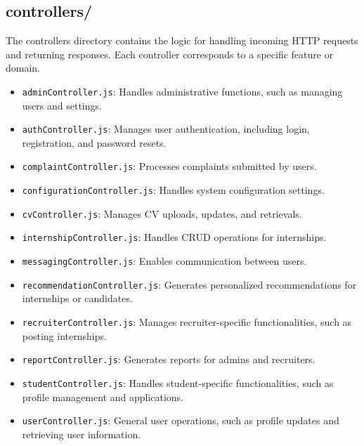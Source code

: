 \subsection{controllers/}
The controllers directory contains the logic for handling incoming HTTP requests and returning responses. Each controller corresponds to a specific feature or domain.
\begin{itemize}
    \item \texttt{adminController.js}: Handles administrative functions, such as managing users and settings.
    \item \texttt{authController.js}: Manages user authentication, including login, registration, and password resets.
    \item \texttt{complaintController.js}: Processes complaints submitted by users.
    \item \texttt{configurationController.js}: Handles system configuration settings.
    \item \texttt{cvController.js}: Manages CV uploads, updates, and retrievals.
    \item \texttt{internshipController.js}: Handles CRUD operations for internships.
    \item \texttt{messagingController.js}: Enables communication between users.
    \item \texttt{recommendationController.js}: Generates personalized recommendations for internships or candidates.
    \item \texttt{recruiterController.js}: Manages recruiter-specific functionalities, such as posting internships.
    \item \texttt{reportController.js}: Generates reports for admins and recruiters.
    \item \texttt{studentController.js}: Handles student-specific functionalities, such as profile management and applications.
    \item \texttt{userController.js}: General user operations, such as profile updates and retrieving user information.
\end{itemize}

